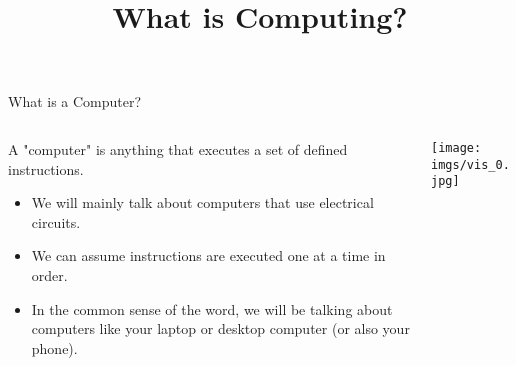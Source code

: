 \documentclass[]{beamer}
\title{What is Computing?}
\date{}
\begin{document}
\begin{frame}
    \titlepage
\end{frame}

\begin{frame}{What is a Computer?}

    \begin{columns}
        \begin{column}{0.5\textwidth}
            A "computer" is anything that executes a set of defined instructions.

            \vspace{\baselineskip}

            \begin{itemize}
                \item We will mainly talk about computers that use electrical circuits.
                \item We can assume instructions are executed one at a time in order.
                \item In the common sense of the word, we will be talking about computers like your laptop or desktop computer (or also your phone).
            \end{itemize}
        \end{column}
        \begin{column}{0.5\textwidth}
            \texttt{[image: imgs/vis\_0.jpg]}
        \end{column}
    \end{columns}
\end{frame}
\end{document}
